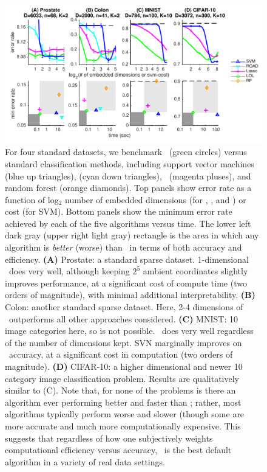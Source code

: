 \documentclass[10pt]{article}
\begin{document}
\begin{figure}
\centering
\includegraphics[width=1\linewidth]{../Figs/realdata}
\caption{
For four standard datasets, we benchmark \Lol~(green circles) versus standard classification methods, including support vector machines (blue up triangles),  (cyan down triangles), ~(magenta pluses), and random forest (orange diamonds). 
Top panels show error rate as a function of log$_2$ number of embedded dimensions (for \Lol, , and ) or cost (for SVM).
Bottom panels show the minimum error rate achieved by each of the five algorithms versus time.
The lower left dark gray (upper right light gray) rectangle is the area in which any algorithm is \emph{better}  (worse) than \Lol~in terms of both accuracy and efficiency.
\textbf{(A)} Prostate: a standard sparse dataset.  1-dimensional \Lol~does very well, although keeping $2^5$ ambient coordinates slightly improves performance, at a significant cost of compute time (two orders of magnitude), with minimal additional interpretability.
\textbf{(B)} Colon: another standard sparse dataset.  Here, 2-4 dimensions of \Lol~outperforms all other approaches considered.
\textbf{(C)} MNIST: 10 image categories here, so  is not possible.  \Lol~does very well regardless of the number of dimensions kept.  SVN marginally improves on \Lol~accuracy, at a significant cost in computation (two orders of magnitude).
\textbf{(D)} CIFAR-10: a higher dimensional and newer 10 category image classification problem.  Results are qualitatively similar to (C).
% 
Note that, for none of the problems is there an algorithm ever performing better and faster than \Lol; rather, most algorithms typically perform worse and slower (though some are more accurate and much more computationally expensive. 
This suggests that regardless of how one subjectively weights computational efficiency versus accuracy, \Lol~is the best default algorithm in a variety of real data settings.
}
\label{fig:realdata}
\end{figure}
\end{document}
